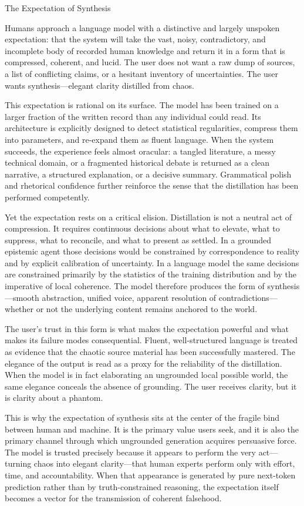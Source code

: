 The Expectation of Synthesis

Humans approach a language model with a distinctive and largely unspoken expectation: that the system will take the vast, noisy, contradictory, and incomplete body of recorded human knowledge and return it in a form that is compressed, coherent, and lucid. The user does not want a raw dump of sources, a list of conflicting claims, or a hesitant inventory of uncertainties. The user wants synthesis—elegant clarity distilled from chaos.

This expectation is rational on its surface. The model has been trained on a larger fraction of the written record than any individual could read. Its architecture is explicitly designed to detect statistical regularities, compress them into parameters, and re-expand them as fluent language. When the system succeeds, the experience feels almost oracular: a tangled literature, a messy technical domain, or a fragmented historical debate is returned as a clean narrative, a structured explanation, or a decisive summary. Grammatical polish and rhetorical confidence further reinforce the sense that the distillation has been performed competently.

Yet the expectation rests on a critical elision. Distillation is not a neutral act of compression. It requires continuous decisions about what to elevate, what to suppress, what to reconcile, and what to present as settled. In a grounded epistemic agent those decisions would be constrained by correspondence to reality and by explicit calibration of uncertainty. In a language model the same decisions are constrained primarily by the statistics of the training distribution and by the imperative of local coherence. The model therefore produces the form of synthesis—smooth abstraction, unified voice, apparent resolution of contradictions—whether or not the underlying content remains anchored to the world.

The user’s trust in this form is what makes the expectation powerful and what makes its failure modes consequential. Fluent, well-structured language is treated as evidence that the chaotic source material has been successfully mastered. The elegance of the output is read as a proxy for the reliability of the distillation. When the model is in fact elaborating an ungrounded local possible world, the same elegance conceals the absence of grounding. The user receives clarity, but it is clarity about a phantom.

This is why the expectation of synthesis sits at the center of the fragile bind between human and machine. It is the primary value users seek, and it is also the primary channel through which ungrounded generation acquires persuasive force. The model is trusted precisely because it appears to perform the very act—turning chaos into elegant clarity—that human experts perform only with effort, time, and accountability. When that appearance is generated by pure next-token prediction rather than by truth-constrained reasoning, the expectation itself becomes a vector for the transmission of coherent falsehood.

